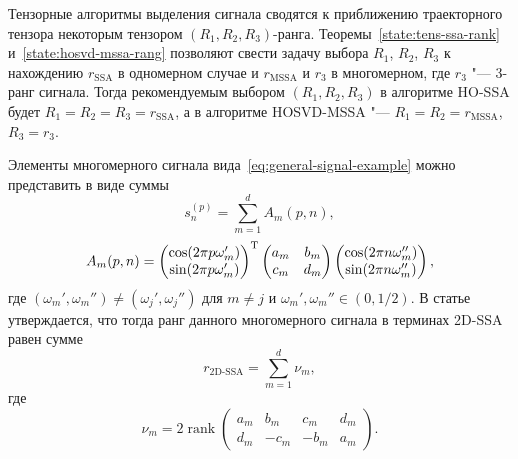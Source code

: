 \documentclass[specialist,
    substylefile = spbu.rtx,
    subf,href,colorlinks=true, 12pt]{disser}
\theoremstyle{plain}
\theoremstyle{definition}
\theoremstyle{remark}
\begin{document}
    Тензорные алгоритмы выделения сигнала сводятся к приближению траекторного тензора некоторым
    тензором $(R_1, R_2, R_3)$-ранга.
    Теоремы~\ref{state:tens-ssa-rank} и~\ref{state:hosvd-mssa-rang} позволяют свести задачу выбора $R_1$,
    $R_2$, $R_3$ к нахождению $r_{\text{SSA}}$ в одномерном случае и $r_\text{MSSA}$ и $r_3$ в многомерном,
    где $r_3$ "--- 3-ранг сигнала.
    Тогда рекомендуемым выбором $(R_1, R_2, R_3)$ в алгоритме HO-SSA будет $R_1=R_2=R_3=r_\text{SSA}$, а
    в алгоритме HOSVD-MSSA "--- $R_1=R_2=r_\text{MSSA}$, $R_3 = r_3$.

    Элементы многомерного сигнала вида~\eqref{eq:general-signal-example} можно
    представить в виде суммы
    \[
        s^{(p)}_n = \sum_{m=1}^{d} A_m(p, n),
    \]
    \[
        A_m(p, n) =
        \begin{pmatrix}
            \cos(2\pi p\omega_m') \\
            \sin(2\pi p\omega_m')
        \end{pmatrix}^{\mathrm{T}}
        \begin{pmatrix}
            a_m & b_m \\
            c_m & d_m
        \end{pmatrix}
        \begin{pmatrix}
            \cos(2\pi n\omega_m'') \\
            \sin(2\pi n\omega_m'')
        \end{pmatrix},
    \]
    где $(\omega_m', \omega_m'') \ne (\omega_j', \omega_j'')$ для $m\ne j$ и $\omega_m', \omega_m'' \in (0, 1/2)$.
    В статье~\cite{2d-ssa} утверждается, что тогда ранг данного многомерного сигнала в терминах
    2D-SSA равен сумме
    \[
        r_\text{2D-SSA} = \sum_{m=1}^{d} \nu_m,
    \]
    где
    \[
        \nu_m = 2\operatorname{rank}\begin{pmatrix}
            a_m & b_m  & c_m  & d_m \\
            d_m & -c_m & -b_m & a_m
        \end{pmatrix}.
    \]
\end{document}
